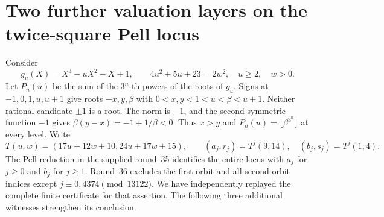 \documentclass[11pt,a4paper]{article}
\theoremstyle{definition}\newtheorem{definition}[theorem]{Definition}
\theoremstyle{remark}\newtheorem{remark}[theorem]{Remark}
\begin{document}
\section{Two further valuation layers on the twice-square Pell locus}
\label{pis:sec:pell-new}
Consider
\[
 g_u(X)=X^3-uX^2-X+1,\qquad
 4u^2+5u+23=2w^2,\quad u\ge2,\quad w>0.
\]
Let $P_n(u)$ be the sum of the $3^n$-th powers of the roots of $g_u$.
Signs at $-1,0,1,u,u+1$ give roots $-x,y,\beta$ with
$0<x,y<1<u<\beta<u+1$. Neither rational candidate $\pm1$ is a root.
The norm is $-1$, and the second symmetric function $-1$ gives
$\beta(y-x)=-1+1/\beta<0$. Thus $x>y$ and
$P_n(u)=\lfloor\beta^{3^n}\rfloor$ at every level.
Write
\[
 T(u,w)=(17u+12w+10,24u+17w+15),\qquad
 (a_j,r_j)=T^j(9,14),\quad (b_j,s_j)=T^j(1,4).
\]
The Pell reduction in the supplied round~35 identifies the entire
locus with $a_j$ for $j\ge0$ and $b_j$ for $j\ge1$.
Round~36 excludes the first orbit and all second-orbit indices except
$j\equiv0,4374\pmod{13122}$. We have independently replayed the
complete finite certificate for that assertion. The following
three additional witnesses strengthen its conclusion.
\end{document}
